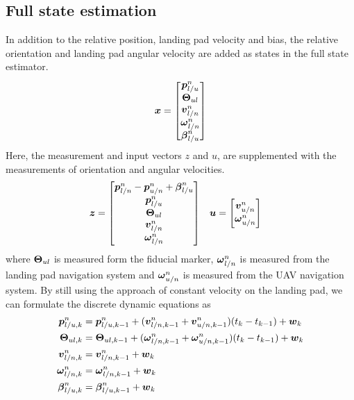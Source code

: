 \subsection{Full state estimation}\label{sec:fullState}
In addition to the relative position, landing pad velocity and bias, the relative orientation and landing pad angular velocity are added as states in the full state estimator. 
\begin{equation}\label{eq:stateVect}
    \boldsymbol{x}
    =
    \begin{bmatrix}
        \boldsymbol{p}^{n}_{l/u}\\
        \boldsymbol{\Theta}_{ul}\\
        \boldsymbol{v}^{n}_{l/n}\\
        \boldsymbol{\omega}^{n}_{l/n}\\
        \boldsymbol{\beta}_{l/u}^{n}
    \end{bmatrix}
\end{equation}
Here, the  measurement and input vectors $z$ and $u$, are supplemented with the measurements of orientation and angular velocities.
\begin{align}
    \boldsymbol{z}&=
    \begin{bmatrix}
        \boldsymbol{p}^{n}_{l/n} - \boldsymbol{p}^{n}_{u/n} + \boldsymbol{\beta}_{l/u}^{n}\\
        \boldsymbol{p}^{n}_{l/u}\\
        \boldsymbol{\Theta}_{ul}\\
        \boldsymbol{v}^{n}_{l/n}\\
        \boldsymbol{\omega}^{n}_{l/n}
    \end{bmatrix}
    &
    \boldsymbol{u}&=
    \begin{bmatrix}
        \boldsymbol{v}^{n}_{u/n}\\
        \boldsymbol{\omega}^{n}_{u/n}
    \end{bmatrix}
\end{align}
where $\boldsymbol{\Theta}_{ul}$ is measured form the fiducial marker, $\boldsymbol{\omega}^{n}_{l/n}$ is measured from the landing pad navigation system and $\boldsymbol{\omega}^{n}_{u/n}$ is measured from the UAV navigation system. By still using the approach of constant velocity on the landing pad, we can formulate the discrete dynamic equations as
\begin{align*}
    \boldsymbol{p}^{n}_{l/u, k}&=\boldsymbol{p}^{n}_{l/u, k-1}+(\boldsymbol{v}^{n}_{l/n, k-1} +\boldsymbol{v}^{n}_{u/n, k-1})(t_{k}-t_{k-1})+\boldsymbol{w}_k\\
    \boldsymbol{\Theta}_{ul, k}&=\boldsymbol{\Theta}_{ul, k-1}+(\boldsymbol{\omega}^{n}_{l/n, k-1}+\boldsymbol{\omega}^{n}_{u/n, k-1})(t_{k}-t_{k-1})+\boldsymbol{w}_k\\
    \boldsymbol{v}^{n}_{l/n, k}&=\boldsymbol{v}^{n}_{l/n, k-1}+\boldsymbol{w}_k\\
    \boldsymbol{\omega}^{n}_{l/n, k}&=\boldsymbol{\omega}^{n}_{l/n, k-1}+\boldsymbol{w}_k\\
    \boldsymbol{\beta}_{l/u,k}^{n}&=\boldsymbol{\beta}_{l/u,k-1}^{n}+\boldsymbol{w}_k
\end{align*}
